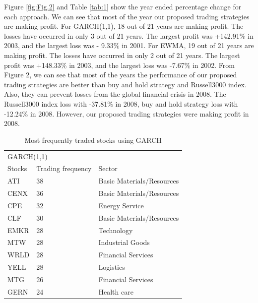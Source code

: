 \documentclass[11pt,a4paper]{article}
\begin{document}
    \newpage
    \noindent
    Figure \ref{fig:Fig.2} and Table \ref{tab:1} show the year ended percentage change for each approach. We can see that most of the year our proposed trading strategies are making profit. For GARCH(1,1), 18 out of 21 years are making profit. The losses have occurred in only 3 out of 21 years. The largest profit was +142.91\% in 2003, and the largest loss was  - 9.33\% in 2001. For EWMA, 19 out of 21 years are making profit. The losses have occurred in only 2 out of 21 years. The largest profit was +148.33\% in 2003, and the largest loss was -7.67\% in 2002. From Figure 2, we can see that most of the years the performance of our proposed trading strategies are better than buy and hold strategy and Russell3000 index. Also, they can prevent losses from the global financial crisis in 2008. The Russell3000 index loss with -37.81\% in 2008, buy and hold strategy loss with -12.24\% in 2008. However, our proposed trading strategies were making profit in 2008.
    
    
    \begin{table}[H]
    \centering
    \begin{tabular}{lll}
    \hline
    \multicolumn{3}{l}{GARCH(1,1)}                         \\
    Stocks & Trading frequency & Sector                    \\ \hline
    ATI    & 38                & Basic Materials/Resources \\
    CENX   & 36                & Basic Materials/Resources \\
    CPE    & 32                & Energy Service            \\
    CLF    & 30                & Basic Materials/Resources \\
    EMKR   & 28                & Technology                \\
    MTW    & 28                & Industrial Goods          \\
    WRLD   & 28                & Financial Services        \\
    YELL   & 28                & Logistics                 \\
    MTG    & 26                & Financial Services        \\
    GERN   & 24                & Health care               \\ \hline
    \end{tabular}
    \caption{Most frequently traded stocks using GARCH}
    \label{tab:2}
    \end{table}
    
\end{document}
